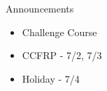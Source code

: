 \begin{frame}{Announcements}
    \begin{itemize}
        \item Challenge Course
        \item CCFRP - 7/2, 7/3
        \item Holiday - 7/4
    \end{itemize}
\end{frame}
